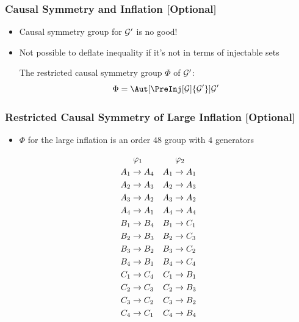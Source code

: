 \documentclass[
    hyperref={bookmarks=false},%
    xcolor={dvipsnames},
]{beamer}
\renewcommand{\term}[1]{\textcolor{Mahogany}{#1}}
\begin{document}
\begin{frame}
    \frametitle{Causal Symmetry and Inflation [Optional]}
    \begin{itemize}
        \item Causal symmetry group for $\mathcal{G}'$ is no good!
        \item Not possible to deflate inequality if it's not in terms of injectable sets
        \begin{definition}
            The \term{restricted causal symmetry group} $\Phi$ of $\mathcal{G}'$:
            \[ \Phi = \Aut[\PreInj[\graph]{\graph'}]{\graph'} \]
        \end{definition}
    \end{itemize}
\end{frame}

\begin{frame}
    \frametitle{Restricted Causal Symmetry of Large Inflation [Optional]}
    \begin{itemize}
        \item $\Phi$ for the large inflation is an order $48$ group with $4$ generators
    \end{itemize}
    \begin{equation*}
    \begin{aligned}[c]
    &\hspace{1mm}\gep_1 \\
    A_1 &\to A_4 \\A_2 &\to A_3 \\A_3 &\to A_2 \\A_4 &\to A_1 \\B_1 &\to B_4 \\B_2 &\to B_3 \\B_3 &\to B_2 \\B_4 &\to B_1 \\C_1 &\to C_4 \\C_2 &\to C_3 \\C_3 &\to C_2 \\C_4 &\to C_1
    \end{aligned}
    \quad
    \begin{aligned}[c]
    &\hspace{1mm}\gep_2 \\
    A_1 &\to A_1 \\A_2 &\to A_3 \\A_3 &\to A_2 \\A_4 &\to A_4 \\B_1 &\to C_1 \\B_2 &\to C_3 \\B_3 &\to C_2 \\B_4 &\to C_4 \\C_1 &\to B_1 \\C_2 &\to B_3 \\C_3 &\to B_2 \\C_4 &\to B_4

\end{aligned}
\end{equation*}
\end{frame}
\end{document}
